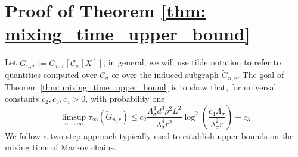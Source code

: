 \documentclass[11pt,twoside]{article}
\newcommand{\1}{\mathbf{1}}
\newcommand{\Err}{\mathrm{Err}}
\newcommand{\Xbf}{X}             %
\newcommand{\Cset}{\mathcal{C}}
\newcommand{\Csig}{\Cset_{\sigma}}
\begin{document}

\section{Proof of Theorem \ref{thm: mixing_time_upper_bound}}

Let $\widetilde{G}_{n,r} := G_{n,r}[\Csig[\Xbf]]$; in general, we will use tilde notation to refer to quantities computed over $\Csig$ or over the induced subgraph $\widetilde{G}_{n,r}$. The goal of Theorem \ref{thm: mixing_time_upper_bound} is to show that, for universal constants $c_2, c_3,c_4 > 0$, with probability one
\begin{equation*}
\limsup_{n \to \infty} \tau_{\infty}(\widetilde{G}_{n,r}) \leq c_2 \frac{\Lambda_{\sigma}^4 d^3 \rho^2 L^2}{\lambda_{\sigma}^4 r^2} \log^2\left(\frac{c_4 \Lambda_{\sigma}}{\lambda_{\sigma}^2 r}\right) + c_3
\end{equation*}
We follow a two-step approach typically used to establish upper bounds on the mixing time of Markov chains. 
\end{document}
